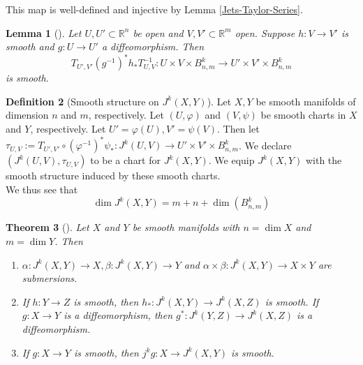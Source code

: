 \documentclass[reqno]{amsart}
\newtheorem{theorem}{Theorem}[section]
\newtheorem{lemma}[theorem]{Lemma}
\theoremstyle{definition}
\newtheorem{definition}[theorem]{Definition}
\theoremstyle{remark}
\begin{document}
This map is well-defined and injective by 
Lemma \ref{Jets-Taylor-Series}.

\begin{lemma}[]
    Let $U, U' \subset \mathbb{R}^{n}$ be open and
    $V,V' \subset \mathbb{R}^{m}$ open.
    Suppose $h \colon V \to V'$ is smooth and
    $g \colon U \to U'$ a diffeomorphism. Then
    \[
    T_{U',V'}\left( g^{-1} \right)^{*} h_* T_{U,V}^{-1}\colon
    U \times V \times B_{n,m}^{k} \to 
    U' \times V' \times B_{n,m}^{k}
    \] 
    is smooth.
\end{lemma}


\begin{definition}[Smooth structure on
    $J^{k}(X,Y)$]
    Let $X,Y$ be smooth manifolds of dimension
    $n$ and $m$, respectively.
    Let $\left( U, \varphi  \right) $ and 
    $\left( V,\psi  \right) $ be smooth charts
    in $X$ and $Y$, respectively. Let
    $U' = \varphi (U), V' = \psi (V)$. Then
    let
    $\tau_{U,V} :=
    T_{U', V'} \circ \left( \varphi^{-1} \right)^{*}
    \psi_* \colon
    J^{k}(U,V) \to U' \times V' \times B_{n,m}^{k}$.
    We declare
    $\left( J^{k}(U,V), \tau_{U,V} \right) $ to
    be a chart for
    $J^{k}(X,Y)$. We equip
    $J^{k}(X,Y)$ with the smooth structure induced by
    these smooth charts.\\
    We thus see that
            \[
            \dim J^{k}(X,Y) = m+n+ \dim \left( B_{n,m}^{k} \right) 
            \] 
\end{definition}


\begin{theorem}[]\label{Thm20419}
    Let $X$ and $Y$ be smooth manifolds with
    $n = \dim X$ and $m = \dim Y$. Then
    \begin{enumerate}
        \item $\alpha \colon J^{k}(X,Y) \to X,
            \beta \colon J^{k}(X,Y) \to Y$ and
            $\alpha \times \beta \colon
            J^{k}(X,Y) \to X \times Y$ are
            submersions.
        \item If $h \colon Y \to Z$ is smooth,
            then $h_* \colon J^{k}(X,Y) \to 
            J^{k}(X,Z)$ is smooth.
            If $g \colon X \to Y$ is a diffeomorphism,
            then $g^{*} \colon J^{k}(Y,Z)
            \to J^{k}(X,Z)$ is a diffeomorphism.
        \item If $g \colon X \to Y$ is smooth, then
            $j^{k}g \colon X \to 
            J^{k}(X,Y)$ is smooth.
    \end{enumerate}
\end{theorem}
\end{document}
